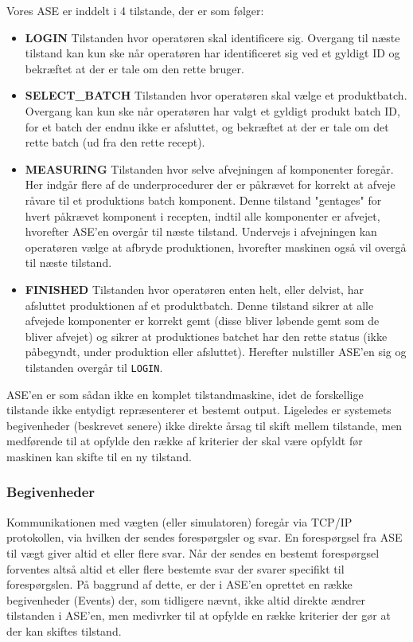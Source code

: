 \documentclass[a4paper]{article}
\begin{document}
Vores ASE er inddelt i 4 tilstande, der er som følger:
\begin{itemize}
  \item \textbf{LOGIN} Tilstanden hvor operatøren skal identificere sig. Overgang til næste tilstand kan kun ske når operatøren har identificeret sig ved et gyldigt ID og bekræftet at der er tale om den rette bruger.
  \item \textbf{SELECT\_BATCH} Tilstanden hvor operatøren skal vælge et produktbatch. Overgang kan kun ske når operatøren har valgt et gyldigt produkt batch ID, for et batch der endnu ikke er afsluttet, og bekræftet at der er tale om det rette batch (ud fra den rette recept).
  \item \textbf{MEASURING} Tilstanden hvor selve afvejningen af komponenter foregår. Her indgår flere af de underprocedurer der er påkrævet for korrekt at afveje råvare til et produktions batch komponent. Denne tilstand "gentages" for hvert påkrævet komponent i recepten, indtil alle komponenter er afvejet, hvorefter ASE'en overgår til næste tilstand. Undervejs i afvejningen kan operatøren vælge at afbryde produktionen, hvorefter maskinen også vil overgå til næste tilstand.
  \item \textbf{FINISHED} Tilstanden hvor operatøren enten helt, eller delvist, har afsluttet produktionen af et produktbatch. Denne tilstand sikrer at alle afvejede komponenter er korrekt gemt (disse bliver løbende gemt som de bliver afvejet) og sikrer at produktiones batchet har den rette status (ikke påbegyndt, under produktion eller afsluttet). Herefter nulstiller ASE'en sig og tilstanden overgår til \texttt{LOGIN}.
\end{itemize}

ASE'en er som sådan ikke en komplet tilstandmaskine, idet de forskellige tilstande ikke entydigt repræsenterer et bestemt output. Ligeledes er systemets begivenheder (beskrevet senere) ikke direkte årsag til skift mellem tilstande, men medførende til at opfylde den række af kriterier der skal være opfyldt før maskinen kan skifte til en ny tilstand.


\subsubsection{Begivenheder} %

Kommunikationen med vægten (eller simulatoren) foregår via TCP/IP protokollen, via hvilken der sendes forespørgsler og svar. En forespørgsel fra ASE til vægt giver altid et eller flere svar. Når der sendes en bestemt forespørgsel forventes altså altid et eller flere bestemte svar der svarer specifikt til forespørgslen. På baggrund af dette, er der i ASE'en oprettet en række begivenheder (Events) der, som tidligere nævnt, ikke altid direkte ændrer tilstanden i ASE'en, men medivrker til at opfylde en række kriterier der gør at der kan skiftes tilstand.
\end{document}
